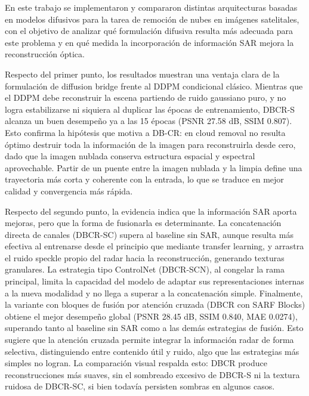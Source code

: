 

En este trabajo se implementaron y compararon distintas arquitecturas basadas en modelos difusivos para la tarea de remoción de nubes en imágenes satelitales, con el objetivo de analizar qué formulación difusiva resulta más adecuada para este problema y en qué medida la incorporación de información SAR mejora la reconstrucción óptica.


Respecto del primer punto, los resultados muestran una ventaja clara de la formulación de diffusion bridge frente al DDPM condicional clásico. Mientras que el DDPM debe reconstruir la escena partiendo de ruido gaussiano puro, y no logra estabilizarse ni siquiera al duplicar las épocas de entrenamiento, DBCR-S alcanza un buen desempeño ya a las 15 épocas (PSNR 27.58 dB, SSIM 0.807). Esto confirma la hipótesis que motiva a DB-CR: en cloud removal no resulta óptimo destruir toda la información de la imagen para reconstruirla desde cero, dado que la imagen nublada conserva estructura espacial y espectral aprovechable. Partir de un puente entre la imagen nublada y la limpia define una trayectoria más corta y coherente con la entrada, lo que se traduce en mejor calidad y convergencia más rápida.


Respecto del segundo punto, la evidencia indica que la información SAR aporta mejoras, pero que la forma de fusionarla es determinante. La concatenación directa de canales (DBCR-SC) supera al baseline sin SAR, aunque resulta más efectiva al entrenarse desde el principio que mediante transfer learning, y arrastra el ruido speckle propio del radar hacia la reconstrucción, generando texturas granulares. La estrategia tipo ControlNet (DBCR-SCN), al congelar la rama principal, limita la capacidad del modelo de adaptar sus representaciones internas a la nueva modalidad y no llega a superar a la concatenación simple. Finalmente, la variante con bloques de fusión por atención cruzada (DBCR con SARF Blocks) obtiene el mejor desempeño global (PSNR 28.45 dB, SSIM 0.840, MAE 0.0274), superando tanto al baseline sin SAR como a las demás estrategias de fusión. Esto sugiere que la atención cruzada permite integrar la información radar de forma selectiva, distinguiendo entre contenido útil y ruido, algo que las estrategias más simples no logran. La comparación visual respalda esto: DBCR produce reconstrucciones más suaves, sin el sombreado excesivo de DBCR-S ni la textura ruidosa de DBCR-SC, si bien todavía persisten sombras en algunos casos.


